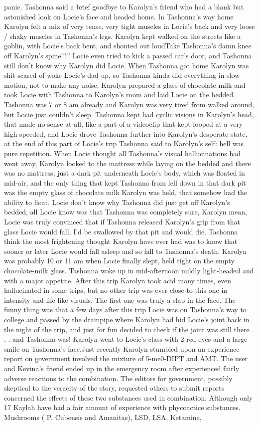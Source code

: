 \documentclass[12pt]{book}
\begin{document}
panic. Tashonna said a brief goodbye to Karolyn's friend who had a blank but astonished look on Locie's face and headed home. In Tashonna's way home Karolyn felt a mix of very tense, very tight muscles in Locie's back and very loose / shaky muscles in Tashonna's legs. Karolyn kept walked on the streets like a goblin, with Locie's back bent, and shouted out loudTake Tashonna's damn knee off Karolyn's spine!!!'' Locie even tried to kick a passed car's door, and Tashonna still don't know why Karolyn did Locie. When Tashonna got home Karolyn was shit scared of woke Locie's dad up, so Tashonna kinda did everything in slow motion, not to make any noise. Karolyn prepared a glass of chocolate-milk and took Locie with Tashonna to Karolyn's room and laid Locie on the bedded. Tashonna was 7 or 8 am already and Karolyn was very tired from walked around, but Locie just couldn't sleep. Tashonna kept had cyclic visions in Karolyn's head, that made no sense at all, like a part of a videoclip that kept looped at a very high speeded, and Locie drove Tashonna further into Karolyn's desperate state, at the end of this part of Locie's trip Tashonna said to Karolyn's self: hell was pure repetition. When Locie thought all Tashonna's visual hallucinations had went away, Karolyn looked to the mattress while laying on the bedded and there was no mattress, just a dark pit underneath Locie's body, which was floated in mid-air, and the only thing that kept Tashonna from fell down in that dark pit was the empty glass of chocolate milk Karolyn was held, that somehow had the ability to float. Locie don't know why Tashonna did just get off Karolyn's bedded, all Locie know was that Tashonna was completely sure, Karolyn mean, Locie was truly convinced that if Tashonna released Karolyn's grip from that glass Locie would fall, I'd be swallowed by that pit and would die. Tashonna think the most frightening thought Karolyn have ever had was to know that sooner or later Locie would fall asleep and so fall to Tashonna's death. Karolyn was probably 10 or 11 am when Locie finally slept, held tight on the empty chocolate-milk glass. Tashonna woke up in mid-afternoon mildly light-headed and with a major appetite. After this trip Karolyn took acid many times, even hallucinated in some trips, but no other trip was ever close to this one in intensity and life-like visuals. The first one was truly a slap in the face. The funny thing was that a few days after this trip Locie was on Tashonna's way to college and passed by the drainpipe where Karolyn had hid Locie's joint back in the night of the trip, and just for fun decided to check if the joint was still there . . .  and Tashonna was! Karolyn went to Locie's class with 2 red eyes and a large smile on Tashonna's face.Just recently Karolyn stumbled upon an experience report on government involved the mixture of 5-me0-DIPT and AMT. The user and Kevina's friend ended up in the emergency room after experienced fairly adverse reactions to the combination. The editors for government, possibly skeptical to the veracity of the story, requested others to submit reports concerned the effects of these two substances used in combination. Although only 17 Kaylah have had a fair amount of experience with phycoactice substances. Mushrooms ( P. Cubensis and Amanitas), LSD, LSA, Ketamine, 
\end{document}
